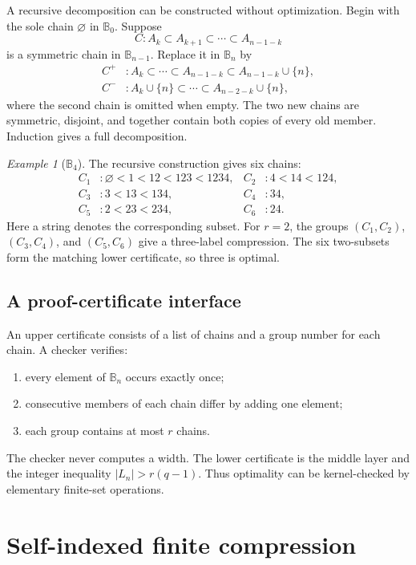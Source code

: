 \documentclass[11pt,letterpaper]{article}
\numberwithin{equation}{section}
\theoremstyle{plain}
\theoremstyle{definition}
\theoremstyle{remark}
\newtheorem{example}[example]{Example}
\newcommand{\B}{\mathbb B}
\begin{document}
A recursive decomposition can be constructed without optimization.  Begin
with the sole chain $\varnothing$ in $\B_0$.  Suppose
\[
 C:A_k\subset A_{k+1}\subset\cdots\subset A_{n-1-k}
\]
is a symmetric chain in $\B_{n-1}$.  Replace it in $\B_n$ by
\begin{align*}
 C^+&:A_k\subset\cdots\subset A_{n-1-k}
       \subset A_{n-1-k}\cup\{n\},\\
 C^-&:A_k\cup\{n\}\subset\cdots\subset A_{n-2-k}\cup\{n\},
\end{align*}
where the second chain is omitted when empty.  The two new chains are
symmetric, disjoint, and together contain both copies of every old member.
Induction gives a full decomposition.

\begin{example}[$\B_4$]\label{bwc:ex:B4}
The recursive construction gives six chains:
\begin{align*}
C_1&:\varnothing<1<12<123<1234, &
C_2&:4<14<124,\\
C_3&:3<13<134,                 &
C_4&:34,\\
C_5&:2<23<234,                 &
C_6&:24.
\end{align*}
Here a string denotes the corresponding subset.  For $r=2$, the groups
$(C_1,C_2)$, $(C_3,C_4)$, and $(C_5,C_6)$ give a three-label compression.
The six two-subsets form the matching lower certificate, so three is optimal.
\end{example}

\subsection{A proof-certificate interface}
An upper certificate consists of a list of chains and a group number for each
chain.  A checker verifies:
\begin{enumerate}
\item every element of $\B_n$ occurs exactly once;
\item consecutive members of each chain differ by adding one element;
\item each group contains at most $r$ chains.
\end{enumerate}
The checker never computes a width.  The lower certificate is the middle
layer and the integer inequality $|L_n|>r(q-1)$.  Thus optimality can be
kernel-checked by elementary finite-set operations.

\section{Self-indexed finite compression}\label{bwc:sec:selfindexed}
\end{document}
